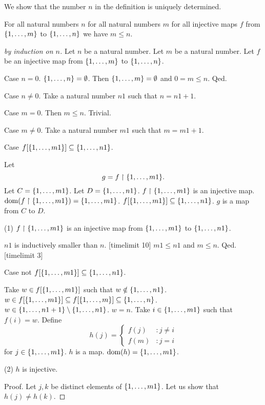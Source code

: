 \documentclass{article}
\begin{document}
  We show that the number $n$ in the definition is uniquely
  determined.
  \begin{forthel}
  
  \begin{lemma}
  For all natural numbers $n$
  for all natural numbers $m$
  for all injective maps $f$ from 
  $\{1,\dots,m\}$ to $\{1,\dots,n\}$ we have $m \leq n$.
  \end{lemma}
  \begin{proof}[by induction on $n$]
  Let $n$ be a natural number.
  Let $m$ be a natural number.
  Let $f$ be an injective map from $\{1,\dots,m\}$ to $\{1,\dots,n\}$.
  
  Case $n=0$. $\{1,\dots,n\} = \emptyset$. Then $\{1,\dots,m\} = \emptyset$ and 
  $0 = m \leq n$. Qed.
  
  Case $n \neq 0$.
  Take a natural number $n1$ such that $n = n1 + 1$.
  
  Case $m = 0$. Then $m \leq n$. Trivial.
  
  Case $m \neq 0$.
  Take a natural number $m1$ such that $m = m1 + 1$.
  
  Case $f[\{1,\dots,m1\}] \subseteq \{1,\dots,n1\}$.

  Let 
$$g = f \upharpoonright \{1,\dots,m1\}.$$
  Let $C = \{1,\dots,m1\}$. Let $D = \{1,\dots,n1\}$.
  $f \upharpoonright \{1,\dots,m1\}$ is an injective map.
  $\operatorname{dom}(f \upharpoonright \{1,\dots,m1\}) = \{1,\dots,m1\}$.
  $f[\{1,\dots,m1\}] \subseteq \{1,\dots,n1\}$.
  $g$ is a map
  from $C$ to $D$.

  (1) $f \upharpoonright \{1,\dots,m1\}$ is an injective map
  from $\{1,\dots,m1\}$ to $\{1,\dots,n1\}$.

  $n1$ is inductively smaller than $n$.
[timelimit 10] %
  $m1 \leq n1$ and $m \leq n$. Qed.
[timelimit 3] %

  Case not $f[\{1,\dots,m1\}] \subseteq \{1,\dots,n1\}$.

  Take $w \in f[\{1,\dots,m1\}]$ such that $w \notin \{1,\dots,n1\}$.
  $w \in f[\{1,\dots,m1\}] \subseteq f[\{1,\dots,m\}] \subseteq \{1,\dots,n\}$.
  $w \in \{1,\dots,n1+1\} \setminus \{1,\dots,n1\}$.
  $w = n$.
  Take $i \in \{1,\dots,m1\}$ such that $f(i) = w$.
  Define
  \[h(j) =
    \begin{cases}
    f(j)  & : j \neq i \\
    f(m) & : j = i
    \end{cases} \]
  for $j \in \{1,\dots,m1\}$.
  $h$ is a map. $\operatorname{dom}(h) = \{1,\dots,m1\}$. 
  
  (2) $h$ is injective.

  Proof.
  Let $j,k$ be distinct elements of $\{1,\dots,m1\}$.
  Let us show that $h(j) \neq h(k)$.
  

\end{proof}
\end{forthel}
\end{document}
